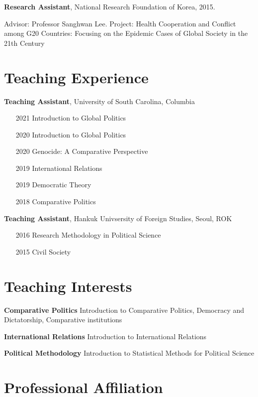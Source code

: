\documentclass[margin,line]{res}
\begin{document}
\begin{resume}
\vspace{-.1cm}
{\bf Research Assistant}, National Research Foundation of Korea, 2015.

\vspace{-.43cm}
{Advisor: Professor Sanghwan Lee. Project: Health Cooperation and Conflict among G20 Countries: Focusing on the Epidemic Cases of Global Society in the 21th Century}

\section{\sc Teaching Experience}

{\bf Teaching Assistant}, University of South Carolina, Columbia

\begin{itemize} \itemsep -1mm 
	\item[2021] Introduction to Global Politics
	\item[2020] Introduction to Global Politics
	\item[2020] Genocide: A Comparative Perspective
	\item[2019] International Relations
	\item[2019] Democratic Theory
	\item[2018] Comparative Politics
\end{itemize}

{\bf Teaching Assistant}, Hankuk Univsersity of Foreign Studies, Seoul, ROK

\begin{itemize} \itemsep -1mm 
	\item[2016] Research Methodology in Political Science
	\item[2015] Civil Society
\end{itemize}

\section{\sc Teaching Interests}
{\bf Comparative Politics} Introduction to Comparative Politics, Democracy and Dictatorship, Comparative institutions

\vspace{-.3cm}
{\bf International Relations} Introduction to International Relations

\vspace{-.3cm}
{\bf Political Methodology} Introduction to Statistical Methods for Political Science

\section{\sc Professional Affiliation}


\end{resume}
\end{document}
